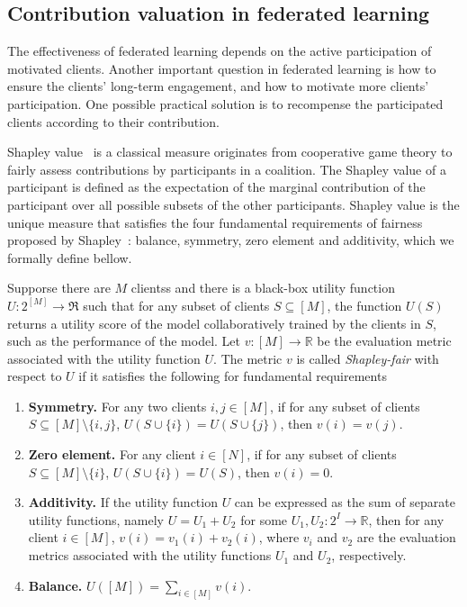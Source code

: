 \subsection{Contribution valuation in federated learning} \label{sec:1-4-2}

The effectiveness of federated learning depends on the active participation of motivated clients. Another important question in federated learning is how to ensure the clients’ long-term engagement, and how to motivate more clients' participation. One possible practical solution is to recompense the participated clients according to their contribution. 

Shapley value~\cite{shapley201617} is a classical measure originates from cooperative game theory to fairly assess contributions by participants in a coalition. 
The Shapley value of a participant is defined as the expectation of the marginal contribution of the participant over all possible subsets of the other participants. Shapley value is the unique measure that satisfies the four fundamental requirements of fairness proposed by Shapley~\cite{shapley201617}: balance, symmetry, zero element and additivity, which we formally define bellow. 

\begin{definition} \label{def:shapley}
    Supporse there are $M$ clientss and there is a black-box utility function $U:2^{[M]} \to \Re$ such that for any subset of clients $S \subseteq [M]$, the function $U(S)$ returns a utility score of the model collaboratively trained by the clients in $S$, such as the performance of the model. Let $v: [M] \to \mathbb{R}$ be the evaluation metric associated with the utility function $U$. The metric $v$ is called \emph{Shapley-fair} with respect to $U$ if it satisfies the following for fundamental requirements
    \begin{enumerate}
        \item \textbf{Symmetry.} For any two clients $i, j \in [M]$, if for any subset of clients $S \subseteq [M] \setminus \{i,j\}$, $U(S \cup \{i\}) = U(S \cup \{j\})$, then $v(i) = v(j)$. 
        \item \textbf{Zero element.} For any client $i \in [N]$, if for any subset of clients $S \subseteq [M] \setminus \{i\}$, $U(S \cup \{i\}) = U(S)$, then $v(i) = 0$.
        \item \textbf{Additivity.} If the utility function $U$ can be expressed as the sum of separate utility functions, namely $U = U_1 + U_2$ for some $U_1, U_2 : 2^I \to \mathbb{R}$, then for any client $i \in [M]$, $v(i) = v_1(i) + v_2(i)$, where $v_i$ and $v_2$ are the evaluation metrics associated with the utility functions $U_1$ and $U_2$, respectively. 
        \item \textbf{Balance.}  $U([M]) = \sum_{i \in [M]} v(i)$.
    \end{enumerate}
\end{definition}


